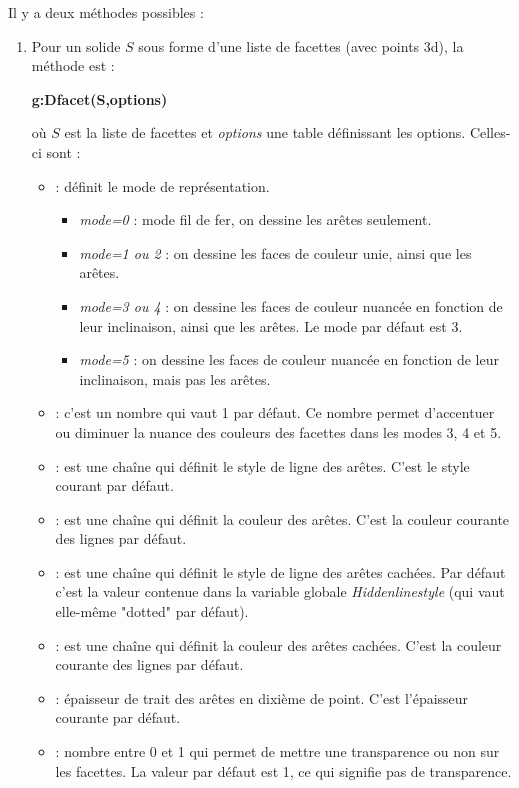 Il y a deux méthodes possibles :
\begin{enumerate}
    \item Pour un solide $S$ sous forme d'une liste de facettes (avec points 3d), la méthode est :
    \par\hfil\textbf{g:Dfacet(S,options)}\hfil\par
    où $S$ est la liste de facettes et \emph{options} une table définissant les options. Celles-ci sont :
\begin{itemize}
    \item {} : définit le mode de représentation.
        \begin{itemize}
            \item \emph{mode=0} : mode fil de fer, on dessine les arêtes seulement.
            \item \emph{mode=1 ou 2} : on dessine les faces de couleur unie, ainsi que les arêtes.
            \item \emph{mode=3 ou 4} : on dessine les faces de couleur nuancée en fonction de leur inclinaison, ainsi que les arêtes. Le mode par défaut est 3.
            \item \emph{mode=5} :  on dessine les faces de couleur nuancée en fonction de leur inclinaison, mais pas les arêtes.
        \end{itemize}
        \item {} : c'est un nombre qui vaut 1 par défaut. Ce nombre permet d'accentuer ou diminuer la nuance des couleurs des facettes dans les modes 3, 4 et 5.
        \item {} : est une chaîne qui définit le style de ligne des arêtes. C'est le style courant par défaut.
        \item {} : est une chaîne qui définit la couleur des arêtes. C'est la couleur courante des lignes par défaut.
        \item {} : est une chaîne qui définit le style de ligne des arêtes cachées. Par défaut c'est la valeur contenue dans la variable globale \emph{Hiddenlinestyle} (qui vaut elle-même "dotted" par défaut).
        \item {} : est une chaîne qui définit la couleur des arêtes cachées. C'est la couleur courante des lignes par défaut.
        \item {} : épaisseur de trait des arêtes en dixième de point. C'est l'épaisseur courante par défaut.
        \item {} : nombre entre 0 et 1 qui permet de mettre une transparence ou non sur les facettes. La valeur par défaut est 1, ce qui signifie pas de transparence.

\end{itemize}
\end{enumerate}
